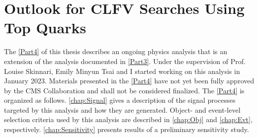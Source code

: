 \part{Outlook for CLFV Searches Using Top Quarks}
\label{Part4}
The \autoref{Part4} of this thesis describes an ongoing physics analysis that is an extension of the analysis documented in \autoref{Part3}. Under the supervision of Prof. Louise Skinnari, Emily Minyun Tsai and I started working on this analysis in January 2023. Materials presented in the \autoref{Part4} have not yet been fully approved by the \ac{CMS} Collaboration and shall not be considered finalized. The \autoref{Part4} is organized as follows. \autoref{chap:Signal} gives a description of the signal processes targeted by this analysis and how they are generated. Object- and event-level selection criteria used by this analysis are described in \autoref{chap:Obj} and \autoref{chap:Evt}, respectively. \autoref{chap:Sensitivity} presents results of a preliminary sensitivity study.




